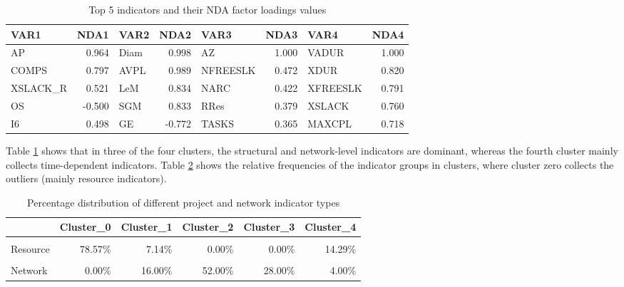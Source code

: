 \documentclass[preprint,
3p]{elsarticle} %
\begin{document}
\begin{table}
\centering
\caption{\label{tab:NDA_TOP5}Top 5 indicators and their NDA factor loadings values}
\centering
\begin{tabular}[t]{lrlrlrlr}
\toprule
\textbf{VAR1} & \textbf{NDA1} & \textbf{VAR2} & \textbf{NDA2} & \textbf{VAR3} & \textbf{NDA3} & \textbf{VAR4} & \textbf{NDA4}\\
\midrule
AP & 0.964 & Diam & 0.998 & AZ & 1.000 & VADUR & 1.000\\
COMPS & 0.797 & AVPL & 0.989 & NFREESLK & 0.472 & XDUR & 0.820\\
XSLACK\_R & 0.521 & LeM & 0.834 & NARC & 0.422 & XFREESLK & 0.791\\
OS & -0.500 & SGM & 0.833 & RRes & 0.379 & XSLACK & 0.760\\
I6 & 0.498 & GE & -0.772 & TASKS & 0.365 & MAXCPL & 0.718\\
\bottomrule
\end{tabular}
\end{table}

Table \ref{tab:NDA_TOP5} shows that in three of the four clusters, the
structural and network-level indicators are dominant, whereas the fourth
cluster mainly collects time-dependent indicators. Table
\ref{tab:PDF_MTX} shows the relative frequencies of the indicator groups
in clusters, where cluster zero collects the outliers (mainly resource
indicators).

\begin{table}[H]
\centering
\caption{\label{tab:PDF_MTX}Percentage distribution of different project and network indicator types}
\centering
\begin{tabular}[t]{lrrrrr}
\toprule
\textbf{ } & \textbf{Cluster\_0} & \textbf{Cluster\_1} & \textbf{Cluster\_2} & \textbf{Cluster\_3} & \textbf{Cluster\_4}\\
\midrule
\cellcolor{gray!10}{Time} & \cellcolor{gray!10}{0.00\%} & \cellcolor{gray!10}{36.36\%} & \cellcolor{gray!10}{0.00\%} & \cellcolor{gray!10}{18.18\%} & \cellcolor{gray!10}{45.45\%}\\
Resource & 78.57\% & 7.14\% & 0.00\% & 0.00\% & 14.29\%\\
\cellcolor{gray!10}{Logic} & \cellcolor{gray!10}{0.00\%} & \cellcolor{gray!10}{73.33\%} & \cellcolor{gray!10}{6.67\%} & \cellcolor{gray!10}{20.00\%} & \cellcolor{gray!10}{0.00\%}\\
Network & 0.00\% & 16.00\% & 52.00\% & 28.00\% & 4.00\%\\
\bottomrule
\end{tabular}
\end{table}
\end{document}
